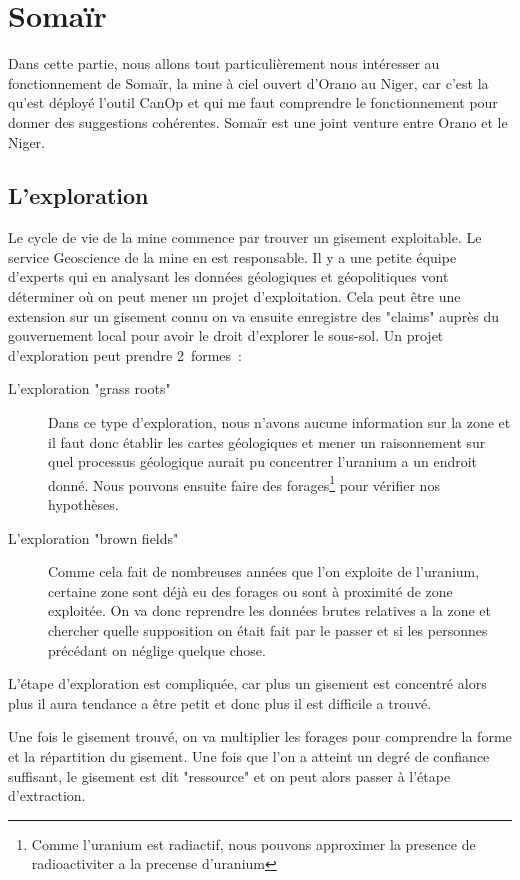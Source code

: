 

\section{Somaïr}
Dans cette partie, nous allons tout particulièrement nous intéresser au fonctionnement de Somaïr, la mine à ciel ouvert d'Orano au Niger, car c'est la qu'est déployé l'outil CanOp et qui me faut comprendre le fonctionnement pour donner des suggestions cohérentes. Somaïr est une joint venture entre Orano et le Niger.
\subsection{L'exploration}

Le cycle de vie de la mine commence par trouver un gisement exploitable. Le service Geoscience de la mine en est responsable. Il y a une petite équipe d'experts qui en analysant les données géologiques et géopolitiques vont déterminer où on peut mener un projet d'exploitation. Cela peut être une extension sur un gisement connu on va ensuite enregistre des "claims" auprès du gouvernement local pour avoir le droit d'explorer le sous-sol. Un projet d'exploration peut prendre 2~formes~:
\begin{description}
    \item[L'exploration "grass roots"] Dans ce type d'exploration, nous n’avons aucune information sur la zone et il faut donc établir les cartes géologiques et mener un raisonnement sur quel processus géologique aurait pu concentrer l'uranium a un endroit donné. Nous pouvons ensuite faire des forages\footnote{Comme l'uranium est radiactif, nous pouvons approximer la presence de radioactiviter a la precense d'uranium} pour vérifier nos hypothèses. %
    \item[L'exploration "brown fields"]Comme cela fait de nombreuses années que l'on exploite de l'uranium, certaine zone sont déjà eu des forages ou sont à proximité de zone exploitée. On va donc reprendre les données brutes relatives a la zone et chercher quelle supposition on était fait par le passer et si les personnes précédant on néglige quelque chose.
\end{description}
L'étape d'exploration est compliquée, car plus un gisement est concentré alors plus il aura tendance a être petit et donc plus il est difficile a trouvé.

Une fois le gisement trouvé, on va multiplier les forages pour comprendre la forme et la répartition du gisement. Une fois que l'on a atteint un degré de confiance suffisant, le gisement est dit "ressource" et on peut alors passer à l’étape d'extraction.







